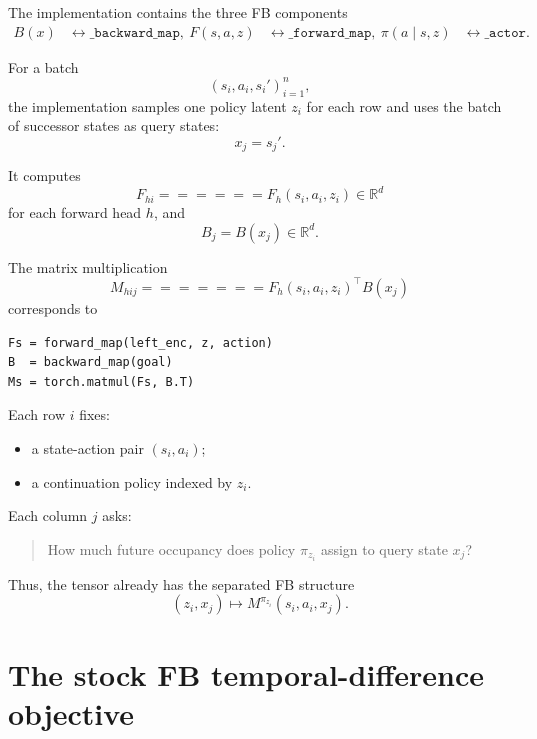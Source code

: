 \documentclass[10pt]{article}
\begin{document}
The implementation contains the three FB components
\begin{align}
B(x)
&\longleftrightarrow
\texttt{_backward_map},
\
F(s,a,z)
&\longleftrightarrow
\texttt{_forward_map},
\
\pi(a\mid s,z)
&\longleftrightarrow
\texttt{_actor}.
\end{align}

For a batch
\begin{equation}
{(s_i,a_i,s_i')}_{i=1}^{n},
\end{equation}
the implementation samples one policy latent $z_i$ for each row and uses the batch of
successor states as query states:
\begin{equation}
x_j=s_j'.
\end{equation}

It computes
\begin{equation}
F_{hi}
======

F_h(s_i,a_i,z_i)
\in\mathbb{R}^d
\end{equation}
for each forward head $h$, and
\begin{equation}
B_j=B(x_j)\in\mathbb{R}^d.
\end{equation}

The matrix multiplication
\begin{equation}
M_{hij}
=======

F_h(s_i,a_i,z_i)^\top B(x_j)
\label{eq:batch-matrix}
\end{equation}
corresponds to
\begin{verbatim}
Fs = forward_map(left_enc, z, action)
B  = backward_map(goal)
Ms = torch.matmul(Fs, B.T)
\end{verbatim}

Each row $i$ fixes:
\begin{itemize}
\item a state-action pair $(s_i,a_i)$;
\item a continuation policy indexed by $z_i$.
\end{itemize}

Each column $j$ asks:
\begin{quote}
How much future occupancy does policy $\pi_{z_i}$ assign to query state $x_j$?
\end{quote}

Thus, the tensor already has the separated FB structure
\begin{equation}
(z_i,x_j)
\longmapsto
M^{\pi_{z_i}}(s_i,a_i,x_j).
\end{equation}

\section{The stock FB temporal-difference objective}
\end{document}
